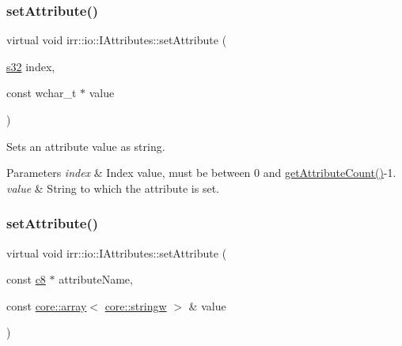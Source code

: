 \subsubsection{\texorpdfstring{set\+Attribute()}{setAttribute()}\hspace{0.1cm}{\footnotesize\ttfamily [4/5]}}
{\footnotesize\ttfamily virtual void irr\+::io\+::\+I\+Attributes\+::set\+Attribute (\begin{DoxyParamCaption}\item[{\hyperlink{namespaceirr_ac66849b7a6ed16e30ebede579f9b47c6}{s32}}]{index,  }\item[{const wchar\+\_\+t $\ast$}]{value }\end{DoxyParamCaption})\hspace{0.3cm}{\ttfamily [pure virtual]}}



Sets an attribute value as string. 


\begin{DoxyParams}{Parameters}
{\em index} & Index value, must be between 0 and \hyperlink{classirr_1_1io_1_1IAttributes_a796bdd9440ee7ba0b6742a90a82870b6}{get\+Attribute\+Count()}-\/1. \\
\hline
{\em value} & String to which the attribute is set. \\
\hline
\end{DoxyParams}
\mbox{\label{classirr_1_1io_1_1IAttributes_a95abee2c34c3a438ba0df22d339b806e}} 
\subsubsection{\texorpdfstring{set\+Attribute()}{setAttribute()}\hspace{0.1cm}{\footnotesize\ttfamily [5/5]}}
{\footnotesize\ttfamily virtual void irr\+::io\+::\+I\+Attributes\+::set\+Attribute (\begin{DoxyParamCaption}\item[{const \hyperlink{namespaceirr_a9395eaea339bcb546b319e9c96bf7410}{c8} $\ast$}]{attribute\+Name,  }\item[{const \hyperlink{classirr_1_1core_1_1array}{core\+::array}$<$ \hyperlink{namespaceirr_1_1core_aef83fafbb1b36fcce44c07c9be23a7f2}{core\+::stringw} $>$ \&}]{value }\end{DoxyParamCaption})\hspace{0.3cm}{\ttfamily [pure virtual]}}



